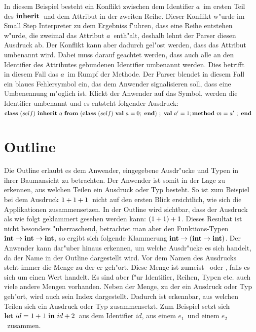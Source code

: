 In diesem Beispiel besteht ein Konflikt zwischen dem Identifier \glqq$a$\grqq\ 
im ersten Teil des \glqq$\binherit$\grqq\ und dem Attribut in der zweiten Reihe. Dieser 
Konflikt w"urde im Small Step Interpreter zu dem Ergebniss f"uhren, dass eine Reihe
entstehen w"urde, die zweimal das Attribut \glqq$a$\grqq\ enth"alt, deshalb
lehnt der Parser diesen Ausdruck ab. Der Konflikt kann aber dadurch gel"ost
werden, dass das Attribut umbenannt wird. Dabei muss darauf geachtet werden,
dass auch alle an den Identifier des Attributes gebundenen Identifier umbenannt
werden. Dies betrifft in diesem Fall das \glqq$a$\grqq\ im Rumpf der Methode.
Der Parser blendet in diesem Fall ein blaues Fehlersymbol ein, das dem Anwender
signalisieren soll, dass eine Umbenennung m"oglich ist. Klickt der Anwender auf
das Symbol, werden die Identifier umbenannt und es entsteht folgender Ausdruck:\\[2mm]
\glqq$\class{self}{\inherit{a}{(\class{self}{\attr{a}{0}})}{\attr{a'}{1} \method{m}{a'}}}$\grqq

\section {Outline}
\label{Outline}
Die Outline erlaubt es dem Anwender, eingegebene Ausdr"ucke und Typen
in ihrer Baumansicht zu betrachten. Der Anwender ist somit in der Lage
zu erkennen, aus welchen Teilen ein Ausdruck oder Typ besteht. So ist zum
Beispiel bei dem Ausdruck \glqq$\infix{+}{\infix{+}{1}{1}}{1}$\grqq\ nicht 
auf den ersten Blick ersichtlich, wie sich die Applikationen zusammensetzen. 
In der Outline wird sichtbar, dass der Ausdruck als wie folgt geklammert gesehen
werden kann: \glqq$\infix{+}{(\infix{+}{1}{1})}{1}$\grqq. Dieses Resultat ist nicht
besonders "uberraschend, betrachtet man aber den Funktions-Typen
\glqq$\arrowtype{\inttype}{\arrowtype{\inttype}{\inttype}}$\grqq, so ergibt sich
folgende Klammerung \glqq$\arrowtype{\inttype}{(\arrowtype{\inttype}{\inttype})}$\grqq.
Der Anwender kann dar"uber hinaus erkennen, um welche Ausdr"ucke es sich
handelt, da der Name in der Outline dargestellt wird. Vor dem Namen des
Ausdrucks steht immer die Menge zu der er geh"ort. Diese Menge ist zumeist
\glqq{\bf e}\grqq\ oder \glqq{\bf v}\grqq, falls es sich um einen Wert handelt.
Es sind aber f"ur Identifier, Reihen, Typen etc. auch viele andere Mengen
vorhanden. Neben der Menge, zu der ein Ausdruck oder Typ geh"ort, wird auch
sein Index dargestellt. Dadurch ist erkennbar, aus welchen Teilen sich ein
Ausdruck oder Typ zusammensetzt. Zum Beispiel setzt sich 
\glqq$\bli{id}{1+1}{id+2}$\grqq\ aus dem Identifier \glqq$id$\grqq, aus einem
\glqq$e_1$\grqq\ und einem \glqq$e_2$\grqq\ zusammen.

